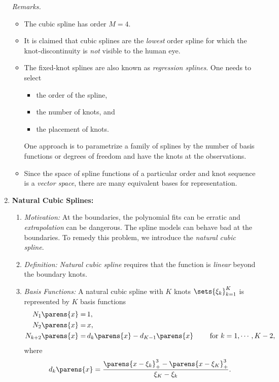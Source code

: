 \documentclass[12pt]{article}
\begin{document}
\begin{enumerate}[label=\textbf{\arabic*.}]
	\textit{Remarks.} 
	\begin{itemize}
		\item The cubic spline has order $M = 4$. 
		
		\item It is claimed that cubic splines are the \emph{lowest} order spline for which the knot-discontinuity is \emph{not} visible to the human eye. 
		
		\item The fixed-knot splines are also known as \textit{regression splines}. One needs to select 
		\begin{itemize}
			\item the order of the spline, 
			\item the number of knots, and 
			\item the placement of knots. 
		\end{itemize}
		One approach is to parametrize a family of splines by the number of basis functions or degrees of freedom and have the knots at the observations. 
		
		\item Since the space of spline functions of a particular order and knot sequence is a \textit{vector space}, there are many equivalent bases for representation. 

	\end{itemize}
	
	\item \textbf{Natural Cubic Splines:} 
	\begin{enumerate}
		\item \textit{Motivation:} At the boundaries, the polynomial fits can be erratic and \textit{extrapolation} can be dangerous. The spline models can behave bad at the boundaries. To remedy this problem, we introduce the \textit{natural cubic spline}. 
		
		\item \textit{Definition:} \emph{Natural cubic spline} requires that the function is \emph{linear} beyond the boundary knots. 

		\item \textit{Basis Functions:} A natural cubic spline with $K$ knots $\sets{\xi_k}_{k=1}^K$ is represented by $K$ basis functions 
		\begin{equation}\label{eq-natural-spline-1}
			\begin{aligned}
				N_1 \parens{x} = & \, 1, \\ 
				N_2 \parens{x} = & \, x, \\ 
				N_{k+2} \parens{x} = & \, d_k \parens{x} - d_{K-1} \parens{x} \qquad \text{ for } k = 1, \cdots, K-2,
			\end{aligned}
		\end{equation}
		where
		\begin{equation}\label{eq-natural-spline-2}
			d_k \parens{x} = \frac{\parens{x - \xi_k}_+^3 - \parens{x - \xi_K}_+^3}{\xi_K - \xi_k}. 
		\end{equation}
		

\end{enumerate}
\end{enumerate}
\end{document}
